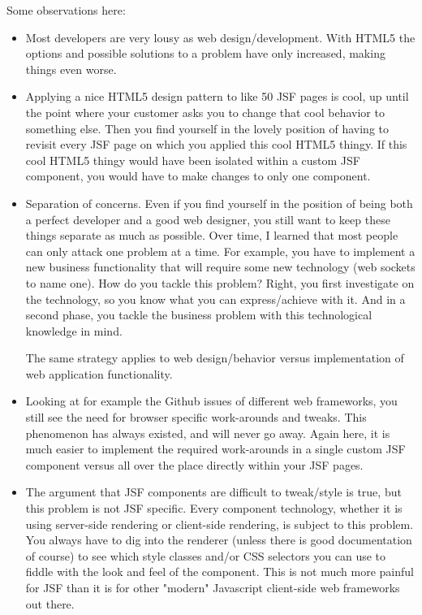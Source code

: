 Some observations here:
\begin{itemize}
	\item Most developers are very lousy as web design/development. With HTML5 the options and possible solutions to a problem have only increased, making things even worse.
	\item Applying a nice HTML5 design pattern to like 50 JSF pages is cool, up until the point where your customer asks you to change that cool behavior to something else. Then you find yourself in the lovely position of having to revisit every JSF page on which you applied this cool HTML5 thingy.
	If this cool HTML5 thingy would have been isolated within a custom JSF component, you would have to make changes to only one component.
	\item Separation of concerns. Even if you find yourself in the position of being both a perfect developer and a good web designer, you still want to keep these things separate as much as possible.
	Over time, I learned that most people can only attack one problem at a time.
	For example, you have to implement a new business functionality that will require some new technology (web sockets to name one).
	How do you tackle this problem? Right, you first investigate on the technology, so you know what you can express/achieve with it.
	And in a second phase, you tackle the business problem with this technological knowledge in mind.
	
	The same strategy applies to web design/behavior versus implementation of web application functionality.
	
	\item Looking at for example the Github issues of different web frameworks,
	you still see the need for browser specific work-arounds and tweaks.
	This phenomenon has always existed, and will never go away.
	Again here, it is much easier to implement the required work-arounds in a single custom JSF component versus all over the place directly within your JSF pages.
	
	\item The argument that JSF components are difficult to tweak/style is true, but this problem is not JSF specific.
	Every component technology, whether it is using server-side rendering or client-side rendering,
	is subject to this problem.
	You always have to dig into the renderer (unless there is good documentation of course)
	to see which style classes and/or CSS selectors you can use to fiddle with the look and feel of the component.
	This is not much more painful for JSF than it is for other "modern" Javascript client-side web frameworks out there.
\end{itemize}

